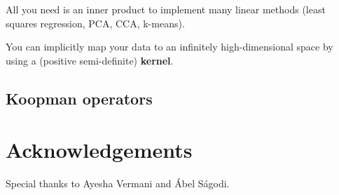 \documentclass[a4paper,11pt]{exam}
\newcounter{ct}
\begin{document}
\begin{questions}
All you need is an inner product to implement many linear methods (least squares regression, PCA, CCA, k-means).

\begin{tcolorbox}[colback=black!1!,title=Kernel Trick]
You can implicitly map your data to an infinitely high-dimensional space by using a (positive semi-definite) \textbf{kernel}.
\end{tcolorbox}

\subsection{Koopman operators}

\end{questions}

\section*{Acknowledgements}
Special thanks to Ayesha Vermani and \'Abel S\'agodi.



\end{document}
